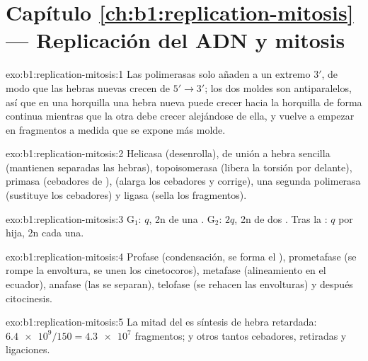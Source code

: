 \section*{Capítulo \ref{ch:b1:replication-mitosis} --- Replicación del ADN y mitosis}

\begin{solution}{exo:b1:replication-mitosis:1}
Las polimerasas solo añaden  a un extremo $3'$, de modo que las
hebras nuevas crecen de $5' \to 3'$; los dos moldes son antiparalelos, así
que en una horquilla una hebra nueva puede crecer hacia la horquilla de
forma continua mientras que la otra debe crecer alejándose de ella, y vuelve
a empezar en fragmentos a medida que se expone más molde.
\end{solution}

\begin{solution}{exo:b1:replication-mitosis:2}
Helicasa (desenrolla),  de unión a hebra sencilla (mantienen
separadas las hebras), topoisomerasa (libera la torsión por delante),
primasa (cebadores de ),  (alarga los cebadores y corrige),
una segunda polimerasa (sustituye los cebadores) y ligasa (sella los
fragmentos).
\end{solution}

\begin{solution}{exo:b1:replication-mitosis:3}
G$_1$: $q$, 2n  de una . G$_2$: $2q$, 2n  de
dos . Tras la : $q$ por hija, 2n  cada una.
\end{solution}

\begin{solution}{exo:b1:replication-mitosis:4}
Profase (condensación, se forma el ), prometafase (se rompe la
envoltura, se unen los cinetocoros), metafase (alineamiento en el ecuador),
anafase (las  se separan), telofase (se rehacen las envolturas) y
después citocinesis.
\end{solution}

\begin{solution}{exo:b1:replication-mitosis:5}
La mitad del  es síntesis de hebra retardada: $\num{6.4e9}/150 =
\num{4.3e7}$ fragmentos; y otros tantos cebadores, retiradas y ligaciones.
\end{solution}

